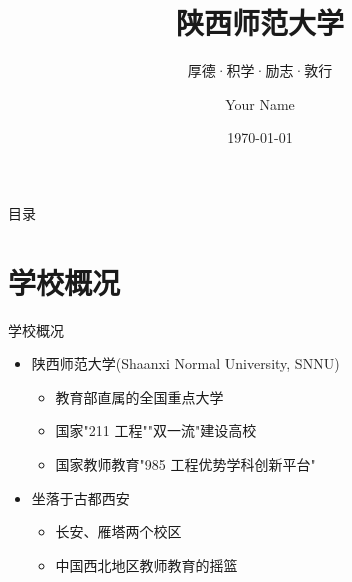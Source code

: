 \documentclass{beamer}
\title{陕西师范大学}
\subtitle{厚德·积学·励志·敦行}
\author{Your Name} %
\institute{Shaanxi Normal University (SNNU)}
\date{\today}
\begin{document}

\frame{\titlepage}

\section[目录]{}
\begin{frame}{目录}
  \tableofcontents
\end{frame}

\section{学校概况}
\begin{frame}{学校概况}
  \begin{itemize}
    \item 陕西师范大学(Shaanxi Normal University, SNNU)
    \begin{itemize}
      \item 教育部直属的全国重点大学
      \item 国家"211 工程""双一流"建设高校
      \item 国家教师教育"985 工程优势学科创新平台"
    \end{itemize}
    \item 坐落于古都西安
    \begin{itemize}
      \item 长安、雁塔两个校区
      \item 中国西北地区教师教育的摇篮
    \end{itemize}
  \end{itemize}
\end{frame}

\end{document}

